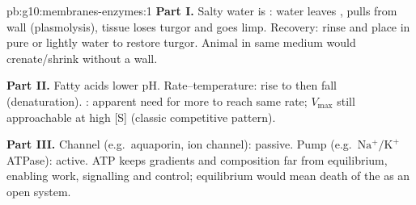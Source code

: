 \begin{solution}{pb:g10:membranes-enzymes:1}
\textbf{Part I.} Salty water is : water leaves ,  pulls from wall (plasmolysis), tissue loses turgor and goes limp.
Recovery: rinse and place in pure or lightly  water to restore
turgor. Animal  in same medium would crenate/shrink without a wall.

\textbf{Part II.} Fatty acids lower pH. Rate--temperature: rise to
 then fall (denaturation). : apparent need
for more  to reach same rate; $V_{\max}$ still approachable at
high [S] (classic competitive pattern).

\textbf{Part III.} Channel (e.g.\ aquaporin, ion channel): passive.
Pump (e.g.\ $\mathrm{Na^+/K^+}$ ATPase): active. ATP keeps gradients and
composition far from equilibrium, enabling work, signalling and 
control; equilibrium would mean death of the  as an open system.
\end{solution}

